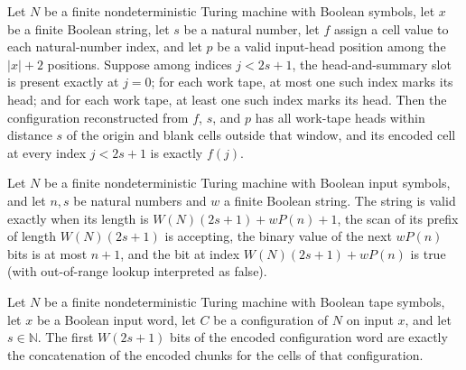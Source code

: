 \begin{theorem}
\label{Complexity.Codec.cellOf_mkCfg}
\leanok
{}
Let $N$ be a finite nondeterministic Turing machine with Boolean symbols, let $x$ be a
finite Boolean string, let $s$ be a natural number, let $f$ assign a cell value to each
natural-number index, and let $p$ be a valid input-head position among the $|x|+2$
positions. Suppose among indices $j<2s+1$, the head-and-summary slot is present exactly
at $j=0$; for each work tape, at most one such index marks its head; and for each work
tape, at least one such index marks its head. Then the configuration reconstructed from
$f$, $s$, and $p$ has all work-tape heads within distance $s$ of the origin and blank
cells outside that window, and its encoded cell at every index $j<2s+1$ is exactly
$f(j)$.
\end{theorem}

\begin{definition}
\label{Complexity.Codec.ValidChk}
\leanok
{}
Let $N$ be a finite nondeterministic Turing machine with Boolean input symbols, and let
$n,s$ be natural numbers and $w$ a finite Boolean string. The string is valid exactly
when its length is $W(N)(2s+1)+wP(n)+1$, the scan of its prefix of length $W(N)(2s+1)$
is accepting, the binary value of the next $wP(n)$ bits is at most $n+1$, and the bit at
index $W(N)(2s+1)+wP(n)$ is true (with out-of-range lookup interpreted as false).
\end{definition}

\begin{lemma}
\label{Complexity.Codec.cfgWord_take}
\leanok
{}
Let $N$ be a finite nondeterministic Turing machine with Boolean tape symbols, let $x$
be a Boolean input word, let $C$ be a configuration of $N$ on input $x$, and let
$s\in\mathbb{N}$. The first $W(2s+1)$ bits of the encoded configuration word are exactly
the concatenation of the encoded chunks for the cells of that configuration.
\end{lemma}

